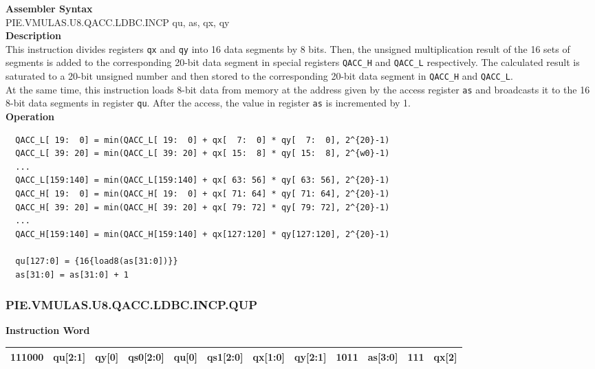 \textbf{Assembler Syntax} \\
PIE.VMULAS.U8.QACC.LDBC.INCP qu, as, qx, qy \\
\textbf{Description} \\
This instruction divides registers \lstinline{qx} and \lstinline{qy} into 16 data segments by 8 bits. Then, the unsigned multiplication result of the 16 sets of segments is added to the corresponding 20-bit data segment in special registers \lstinline{QACC_H} and \lstinline{QACC_L} respectively. The calculated result is saturated to a 20-bit unsigned number and then stored to the corresponding 20-bit data segment in \lstinline{QACC_H} and \lstinline{QACC_L}.\\
At the same time, this instruction loads 8-bit data from memory at the address given by the access register \lstinline{as} and broadcasts it to the 16 8-bit data segments in register \lstinline{qu}. After the access, the value in register \lstinline{as} is incremented by 1.\\
\textbf{Operation}
\begin{lstlisting}
  QACC_L[ 19:  0] = min(QACC_L[ 19:  0] + qx[  7:  0] * qy[  7:  0], 2^{20}-1)
  QACC_L[ 39: 20] = min(QACC_L[ 39: 20] + qx[ 15:  8] * qy[ 15:  8], 2^{w0}-1)
  ...
  QACC_L[159:140] = min(QACC_L[159:140] + qx[ 63: 56] * qy[ 63: 56], 2^{20}-1)
  QACC_H[ 19:  0] = min(QACC_H[ 19:  0] + qx[ 71: 64] * qy[ 71: 64], 2^{20}-1)
  QACC_H[ 39: 20] = min(QACC_H[ 39: 20] + qx[ 79: 72] * qy[ 79: 72], 2^{20}-1)
  ...
  QACC_H[159:140] = min(QACC_H[159:140] + qx[127:120] * qy[127:120], 2^{20}-1)

  qu[127:0] = {16{load8(as[31:0])}}
  as[31:0] = as[31:0] + 1
\end{lstlisting}

\newpage
\subsubsection{PIE.VMULAS.U8.QACC.LDBC.INCP.QUP}\label{instruction:PIEVMULASU8QACCLDBCINCPQUP}
\setlength\tabcolsep{6pt}
\textbf{Instruction Word} \\
\begin{tabular}{|c|c|c|c|c|c|c|c|c|c|c|c|}
	\hline
	111000 & qu[2:1] & qy[0] & qs0[2:0] & qu[0] & qs1[2:0] & qx[1:0] & qy[2:1] & 1011 & as[3:0] & 111 & qx[2] \\
	\hline
\end{tabular}


